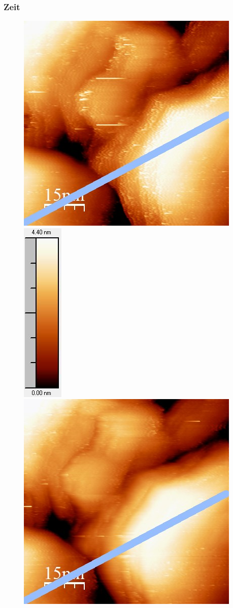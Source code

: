 \documentclass[12pt,a4paper]{article}
\begin{document}
\subsubsection{Zeit}
\begin{figure}
\centering
\includegraphics[scale=0.6]{Bilder/Anhang/Zeit/0_052_Zeit_vor.jpg}
\includegraphics[scale=0.6]{Bilder/Anhang/Zeit/0_052_Zeit_vor_Skala.jpg}
\includegraphics[scale=0.6]{Bilder/Anhang/Zeit/0_052_Zeit_nach.jpg}

\end{figure}
\end{document}
